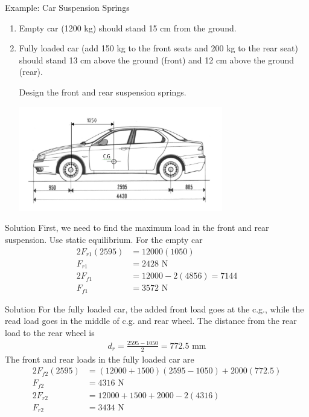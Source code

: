 \documentclass[10pt, svgnames]{beamer}
\begin{document}
\begin{frame}[label={sec:orge2f6088}]{Example: Car Suspension Springs}
\begin{enumerate}
\item Empty car (1200 kg) should stand 15 cm from the ground.
\item Fully loaded car (add 150 kg to the front seats and 200 kg to the rear seat) should stand 13 cm above the ground (front) and 12 cm above the ground (rear).

Design the front and rear suspension springs.

\centering
\includegraphics[width=0.7\textwidth]{pictures/car-example}
\end{enumerate}
\end{frame}

\begin{frame}[label={sec:org9e952de}]{Solution}
First, we need to find the maximum load in the front and rear suspension. Use static equilibrium. For the empty car
\begin{align*}
  2F_{r1}(2595) &= 12000(1050) \\
  F_{r1} &= 2428 \text{ N} \\
  2F_{f1} &= 12000 - 2(4856) = 7144 \\
  F_{f1} &= 3572 \text{ N}
\end{align*}
\end{frame}

\begin{frame}[label={sec:org76f0b23}]{Solution}
For the fully loaded car, the added front load goes at the c.g., while the read load goes in the middle of c.g. and rear wheel. The distance from the rear load to the rear wheel is
\begin{gather*}
  d_r = \frac{2595 - 1050}{2} = 772.5 \text{ mm}
\end{gather*}
The front and rear loads in the fully loaded car are
\begin{align*}
  2F_{f2}(2595) &= (12000 + 1500)(2595 - 1050) + 2000(772.5) \\
  F_{f2} &= 4316 \text{ N} \\
  2F_{r2} &= 12000 + 1500 + 2000 - 2(4316) \\
  F_{r2} &= 3434 \text{ N}
\end{align*}
\end{frame}
\end{document}
